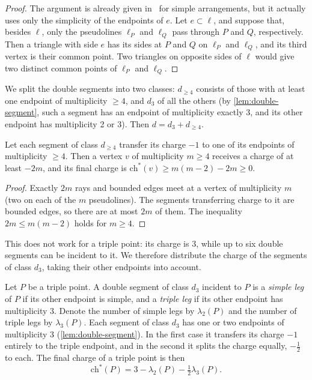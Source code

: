 \begin{proof}
The argument is already given in~\cite[Subsection~2.3]{pu26b} for simple arrangements, but it actually uses only the simplicity of the endpoints of $e$.
Let $e\subset\ell$, and suppose that, besides $\ell$, only the pseudolines $\ell_P$ and $\ell_Q$ pass through $P$ and $Q$, respectively.
Then a triangle with side $e$ has its sides at $P$ and $Q$ on $\ell_P$ and $\ell_Q$, and its third vertex is their common point.
Two triangles on opposite sides of $\ell$ would give two distinct common points of $\ell_P$ and $\ell_Q$.
\end{proof}

We split the double segments into two classes: $d_{\ge4}$ consists of those with at least one endpoint of multiplicity $\ge4$, and $d_3$ of all the others (by \cref{lem:double-segment}, such a segment has an endpoint of multiplicity exactly 3, and its other endpoint has multiplicity 2 or 3).
Then $d=d_3+d_{\ge4}$.

\begin{lemma}\label{lem:charge-ge4}
Let each segment of class $d_{\ge4}$ transfer its charge $-1$ to one of its endpoints of multiplicity $\ge4$.
Then a vertex $v$ of multiplicity $m\ge4$ receives a charge of at least $-2m$, and its final charge is $\mathrm{ch}^*(v)\ge m(m-2)-2m\ge0$.
\end{lemma}
\begin{proof}
Exactly $2m$ rays and bounded edges meet at a vertex of multiplicity $m$ (two on each of the $m$ pseudolines).
The segments transferring charge to it are bounded edges, so there are at most $2m$ of them.
The inequality $2m\le m(m-2)$ holds for $m\ge4$.
\end{proof}

This does not work for a triple point: its charge is 3, while up to six double segments can be incident to it.
We therefore distribute the charge of the segments of class $d_3$, taking their other endpoints into account.

Let $P$ be a triple point.
A double segment of class $d_3$ incident to $P$ is a \emph{simple leg} of $P$ if its other endpoint is simple, and a \emph{triple leg} if its other endpoint has multiplicity 3.
Denote the number of simple legs by $\lambda_2(P)$ and the number of triple legs by $\lambda_3(P)$.
Each segment of class $d_3$ has one or two endpoints of multiplicity 3 (\cref{lem:double-segment}).
In the first case it transfers its charge $-1$ entirely to the triple endpoint, and in the second it splits the charge equally, $-\tfrac12$ to each.
The final charge of a triple point is then
\begin{equation}\label{eq:triple-charge}
\mathrm{ch}^*(P)=3-\lambda_2(P)-\tfrac12\lambda_3(P).
\end{equation}

